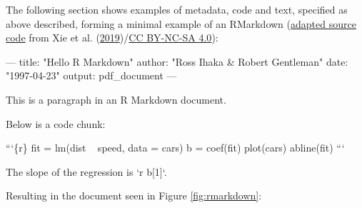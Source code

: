 \documentclass[12pt,a4paper,twoside]{article}
\newenvironment{Shaded}{\begin{snugshade}}{\end{snugshade}}
\newcommand{\AttributeTok}[1]{\textcolor[rgb]{0.77,0.63,0.00}{#1}}
\newcommand{\BaseNTok}[1]{\textcolor[rgb]{0.00,0.00,0.81}{#1}}
\newcommand{\FunctionTok}[1]{\textcolor[rgb]{0.00,0.00,0.00}{#1}}
\newcommand{\NormalTok}[1]{#1}
\newcommand{\OtherTok}[1]{\textcolor[rgb]{0.56,0.35,0.01}{#1}}
\newcommand{\StringTok}[1]{\textcolor[rgb]{0.31,0.60,0.02}{#1}}
\begin{document}
The following section shows examples of metadata, code and text, specified as above described, forming a minimal example of an RMarkdown (\href{https://github.com/rstudio/rmarkdown-book/blob/a10b33d47a2b223a8ef643c245d45e4dfc7091b8/02-basics.Rmd\#L15-L39}{adapted source code} from Xie et al. (\protect\hyperlink{ref-xieMarkdownDefinitiveGuide2019}{2019})/\href{https://creativecommons.org/licenses/by-nc-sa/4.0/}{CC BY-NC-SA 4.0}):

\begin{Shaded}
\begin{Highlighting}[]
\OtherTok{---}
\FunctionTok{title:}\AttributeTok{ }\StringTok{"Hello R Markdown"}
\FunctionTok{author:}\AttributeTok{ }\StringTok{"Ross Ihaka & Robert Gentleman"}
\FunctionTok{date:}\AttributeTok{ }\StringTok{"1997-04-23"}
\FunctionTok{output:}\AttributeTok{ pdf_document}
\OtherTok{---}
\end{Highlighting}
\end{Shaded}

\begin{Shaded}
\begin{Highlighting}[]
\NormalTok{This is a paragraph in an R Markdown document.}

\NormalTok{Below is a code chunk:}

\BaseNTok{```\{r\}}
\BaseNTok{fit = lm(dist ~ speed, data = cars)}
\BaseNTok{b   = coef(fit)}
\BaseNTok{plot(cars)}
\BaseNTok{abline(fit)}
\BaseNTok{```}

\NormalTok{The slope of the regression is }\BaseNTok{`r b[1]`}\NormalTok{.}
\end{Highlighting}
\end{Shaded}

Resulting in the document seen in Figure \ref{fig:rmarkdown}:
\end{document}
